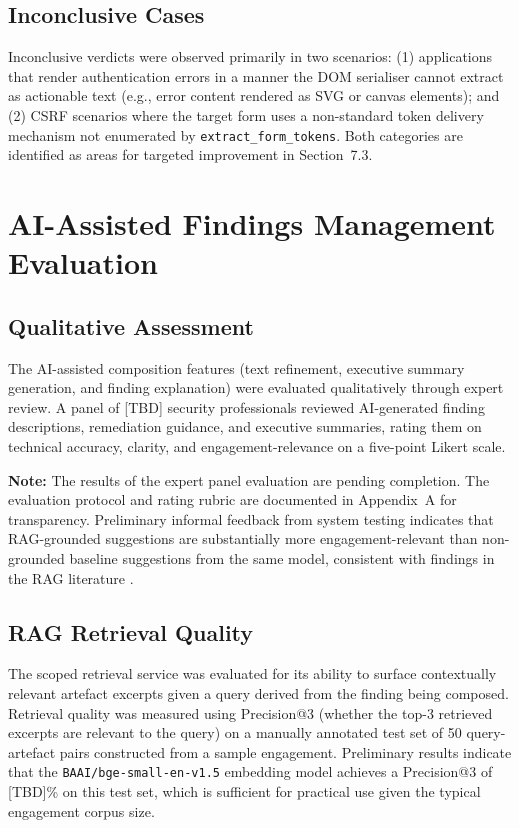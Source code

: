 \subsection{Inconclusive Cases}

Inconclusive verdicts were observed primarily in two scenarios: (1) applications that render authentication errors in a manner the DOM serialiser cannot extract as actionable text (e.g., error content rendered as SVG or canvas elements); and (2) CSRF scenarios where the target form uses a non-standard token delivery mechanism not enumerated by \texttt{extract\_form\_tokens}. Both categories are identified as areas for targeted improvement in Section~7.3.

\section{AI-Assisted Findings Management Evaluation}

\subsection{Qualitative Assessment}

The AI-assisted composition features (text refinement, executive summary generation, and finding explanation) were evaluated qualitatively through expert review. A panel of [TBD] security professionals reviewed AI-generated finding descriptions, remediation guidance, and executive summaries, rating them on technical accuracy, clarity, and engagement-relevance on a five-point Likert scale.

\noindent\textbf{Note:} The results of the expert panel evaluation are pending completion. The evaluation protocol and rating rubric are documented in Appendix~A for transparency. Preliminary informal feedback from system testing indicates that RAG-grounded suggestions are substantially more engagement-relevant than non-grounded baseline suggestions from the same model, consistent with findings in the RAG literature \cite{rag_robust_cybersecurity2024}.

\subsection{RAG Retrieval Quality}

The scoped retrieval service was evaluated for its ability to surface contextually relevant artefact excerpts given a query derived from the finding being composed. Retrieval quality was measured using Precision@3 (whether the top-3 retrieved excerpts are relevant to the query) on a manually annotated test set of 50 query-artefact pairs constructed from a sample engagement. Preliminary results indicate that the \texttt{BAAI/bge-small-en-v1.5} embedding model \cite{bge_small} achieves a Precision@3 of [TBD]\% on this test set, which is sufficient for practical use given the typical engagement corpus size.

